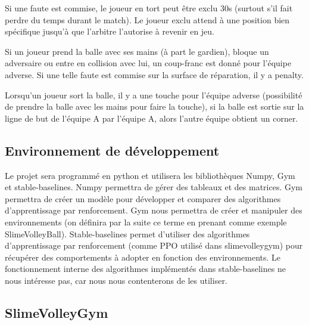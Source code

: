 \documentclass[11pt, a4paper]{article}
\begin{document}
Si une faute est commise, le joueur en tort peut être exclu 30s (surtout s'il fait perdre du temps durant le match). Le joueur exclu attend à une position bien spécifique jusqu'à que l'arbitre l'autorise à revenir en jeu.\newline

Si un joueur prend la balle avec ses mains (à part le gardien), bloque un adversaire ou entre en collision avec lui, un coup-franc est donné pour l'équipe adverse.
Si une telle faute est commise sur la surface de réparation, il y a penalty.

Lorsqu'un joueur sort la balle, il y a une touche pour l'équipe adverse (possibilité de prendre la balle avec les mains pour faire la touche), si la balle est sortie sur la ligne de but de l'équipe A par l'équipe A, alors l'autre équipe obtient un corner.

\subsection{Environnement de développement}



Le projet sera programmé en python et utilisera les bibliothèques Numpy\cite{numpy}, Gym\cite{openaigym} et stable-baselines\cite{stable-baselines}. 
Numpy permettra de gérer des tableaux et des matrices. Gym permettra de créer un modèle pour développer et comparer des algorithmes d'apprentissage par renforcement.
Gym nous permettra de créer et manipuler des environnements \cite{openaigymGit} (on définira par la suite ce terme en prenant comme exemple SlimeVolleyBall). Stable-baselines permet d'utiliser 
des algorithmes d'apprentissage par renforcement 
(comme PPO\cite{PPO} utilisé dans slimevolleygym\cite{slimevolleygym}) pour récupérer des comportements à adopter en fonction des environnements. Le fonctionnement interne des algorithmes implémentés dans stable-baselines ne nous intéresse pas, 
car nous nous contenterons de les utiliser.



\subsection{SlimeVolleyGym}
\end{document}

